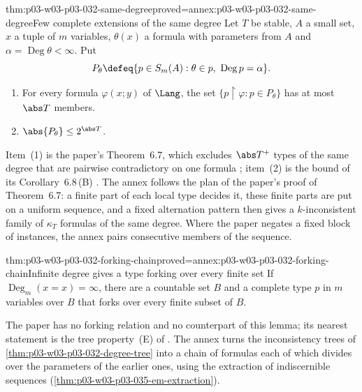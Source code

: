 \begin{hblemma}{thm:p03-w03-p03-032-same-degree}{proved=annex:p03-w03-p03-032-same-degree}{Few complete extensions of the same degree}
Let \(T\) be stable, \(A\) a small set, \(x\) a tuple of \(m\) variables,
\(\theta(x)\) a formula with parameters from \(A\) and
\(\alpha=\operatorname{Deg}\theta<\infty\).  Put
\[
  P_\theta\defeq\{p\in S_m(A):\theta\in p,\ \operatorname{Deg}p=\alpha\}.
\]
\begin{enumerate}
  \item For every formula \(\varphi(x;y)\) of \(\Lang\), the set
        \(\{p\mathbin{\upharpoonright}\varphi:p\in P_\theta\}\) has at most
        \(\abs T\) members.
  \item \(\abs{P_\theta}\leq2^{\abs T}\).
\end{enumerate}
\end{hblemma}

Item~(1) is the paper's Theorem~6.7, which excludes \(\abs T^+\) types of
the same degree that are pairwise contradictory on one formula
\cite[Theorem~6.7, pp.~355--356]{Shelah1971Stability}; item~(2) is the
bound of its Corollary~6.8\,(B) \cite[p.~357]{Shelah1971Stability}.  The
annex follows the plan of the paper's proof of Theorem~6.7: a finite part
of each local type decides it, these finite parts are put on a uniform
sequence, and a fixed alternation pattern then gives a \(k\)-inconsistent
family of \(\kappa_T\) formulas of the same degree.  Where the paper negates
a fixed block of instances, the annex pairs consecutive members of the
sequence.

\begin{hblemma}{thm:p03-w03-p03-032-forking-chain}{proved=annex:p03-w03-p03-032-forking-chain}{Infinite degree gives a type forking over every finite set}
If \(\operatorname{Deg}_m(x=x)=\infty\), there are a countable set \(B\)
and a complete type \(p\) in \(m\) variables over \(B\) that forks over
every finite subset of \(B\).
\end{hblemma}

The paper has no forking relation and no counterpart of this lemma; its
nearest statement is the tree property~(E) of
\cite[Corollary~6.10, p.~357]{Shelah1971Stability}.  The annex turns the
inconsistency trees of \cref{thm:p03-w03-p03-032-degree-tree} into a chain
of formulas each of which divides over the parameters of the earlier ones,
using the extraction of indiscernible sequences
(\cref{thm:p03-w03-p03-035-em-extraction}).

